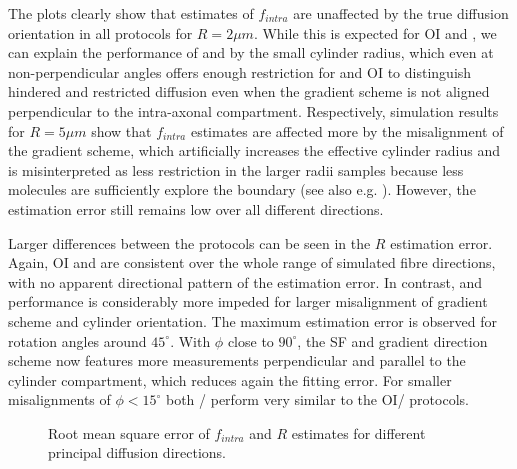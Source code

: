 The plots clearly show that estimates of $f_{intra}$ are unaffected by the true diffusion orientation in all protocols for $R=2\mu m$. While this is expected for {\gls{OI}} and {\SD}, we can explain the performance of {\FD} and {\DO} by the small cylinder radius, which even at non-perpendicular angles offers enough restriction for {\FD} and {\gls{OI}} to distinguish hindered and restricted diffusion even when the gradient scheme is not aligned perpendicular to the intra-axonal compartment. Respectively, simulation results for $R=5\mu m$ show that $f_{intra}$ estimates are affected more by the misalignment of the gradient scheme, which artificially increases the effective cylinder radius and is misinterpreted as less restriction in the larger radii samples because less molecules are sufficiently explore the boundary (see also e.g. \citep{Avram:2004,Zhang:2011}). However, the estimation error still remains low over all different directions.


Larger differences between the protocols can be seen in the $R$ estimation error. Again, {\gls{OI}} and {\SD} are consistent over the whole range of simulated fibre directions, with no apparent directional pattern of the estimation error. In contrast, {\FD} and {\DO} performance is considerably more impeded for larger misalignment of gradient scheme and cylinder orientation. The maximum estimation error is observed for rotation angles around $45^\circ$. With $\phi$ close to $90^\circ$, the {\gls{SF}} and {\DO} gradient direction scheme now features more measurements perpendicular and parallel to the cylinder compartment, which reduces again the fitting error. For smaller misalignments of $\phi<15^\circ$ both {\FD}/{\DO} perform very similar to the {\gls{OI}}/{\SD} protocols.

\begin{figure}[!h]
\centering
    
    
    
  	\caption{Root mean square error of $f_{intra}$ and $R$ estimates for different principal diffusion directions.}
	\label{fig:chapter7 exp1 angular vals 60mT}
\end{figure}


